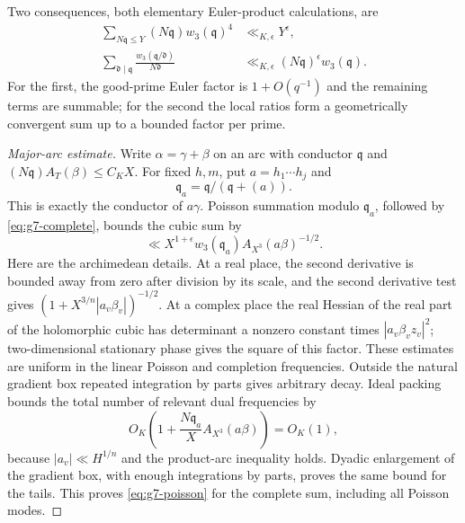 \documentclass[11pt]{amsart}
\theoremstyle{definition}
\numberwithin{equation}{section}
\begin{document}
Two consequences, both elementary Euler-product calculations, are
\begin{align}
 \sum_{N\mathfrak q\le Y}(N\mathfrak q)w_3(\mathfrak q)^4
       &\ll_{K,\epsilon}Y^\epsilon,\label{eq:g7-wsum}\\
 \sum_{\mathfrak d\mid\mathfrak q}
       \frac{w_3(\mathfrak q/\mathfrak d)}{N\mathfrak d}
       &\ll_{K,\epsilon}(N\mathfrak q)^\epsilon w_3(\mathfrak q).
       \label{eq:g7-wconv}
\end{align}
For the first, the good-prime Euler factor is $1+O(q^{-1})$ and the remaining
terms are summable; for the second the local ratios form a geometrically
convergent sum up to a bounded factor per prime.

\begin{proof}[Major-arc estimate]
Write $\alpha=\gamma+\beta$ on an arc with conductor $\mathfrak q$ and
$(N\mathfrak q)A_T(\beta)\le C_KX$.
For fixed $h,m$, put $a=h_1\cdots h_j$ and
\[
 \mathfrak q_a=\mathfrak q/(\mathfrak q+(a)).
\]
This is exactly the conductor of $a\gamma$.
Poisson summation modulo $\mathfrak q_a$, followed by
\eqref{eq:g7-complete}, bounds the cubic sum by
\begin{equation}\label{eq:g7-poisson}
 \ll X^{1+\epsilon}w_3(\mathfrak q_a)
       A_{X^3}(a\beta)^{-1/2}.
\end{equation}
Here are the archimedean details.  At a real place, the second derivative is
bounded away from zero after division by its scale, and the second derivative
test gives $(1+X^{3/n}|a_v\beta_v|)^{-1/2}$.
At a complex place the real Hessian of the real part of the holomorphic cubic
has determinant a nonzero constant times $|a_v\beta_v z_v|^2$;
two-dimensional stationary phase gives the square of this factor.
These estimates are uniform in the linear Poisson and completion frequencies.
Outside the natural gradient box repeated integration by parts gives arbitrary
decay.  Ideal packing bounds the total number of relevant dual frequencies by
\[
 O_K\left(1+\frac{N\mathfrak q_a}{X}A_{X^3}(a\beta)\right)=O_K(1),
\]
because $|a_v|\ll H^{1/n}$ and the product-arc inequality holds.
Dyadic enlargement of the gradient box, with enough integrations by parts,
proves the same bound for the tails.  This proves \eqref{eq:g7-poisson} for
the complete sum, including all Poisson modes.


\end{proof}
\end{document}
